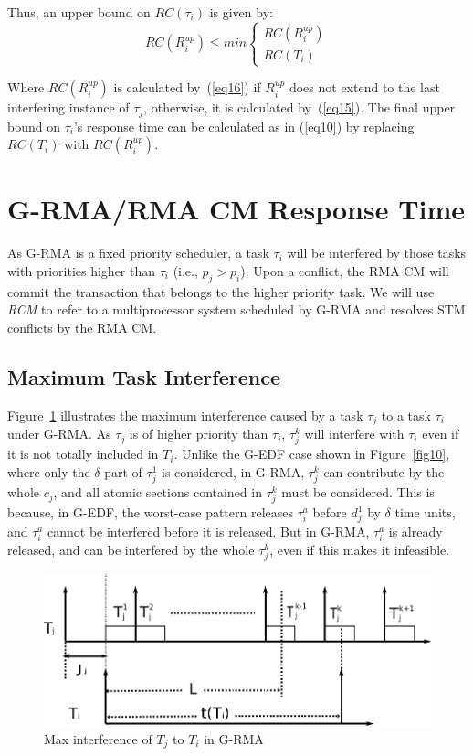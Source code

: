 \documentclass{sig-alternate}
\begin{document}
Thus, an upper bound on $RC(\tau_i)$ is given by:
\begin{equation}
RC(R_{i}^{up})\le min\begin{cases}
RC(R_{i}^{up})\\
RC(T_{i})\end{cases}
\label{eq17}
\end{equation}

Where $RC(R_i^{up})$ is calculated by~(\ref{eq16}) if $R_i^{up}$ does not extend to the last interfering instance of $\tau_j$, otherwise, it is calculated by~(\ref{eq15}). The final upper bound on $\tau_{i}$'s response time can be calculated
as in (\ref{eq10}) by replacing $RC(T_{i})$ with
$RC(R_{i}^{up})$.

\section{G-RMA/RMA CM Response Time}
\label{sec:g-rma-rma-cm}

As G-RMA is a fixed priority scheduler,  a task $\tau_{i}$ will be interfered by those tasks with priorities higher than $\tau_{i}$ (i.e., $p_{j}>p_{i}$).  Upon a conflict, the RMA CM will commit the transaction that belongs to the higher priority task. We will use \emph{RCM} to refer to a multiprocessor system scheduled by G-RMA and resolves STM conflicts by the RMA CM.


\subsection{Maximum Task Interference}


Figure~\ref{fig11} illustrates the maximum interference caused by a task $\tau_{j}$
to a task $\tau_{i}$ under G-RMA. As $\tau_{j}$ is of higher priority than $\tau_{i}$,
$\tau_{j}^{k}$ will interfere with $\tau_{i}$ even if it is not totally
included in $T_{i}$. Unlike the G-EDF case shown in Figure~\ref{fig10}, 
where only the $\delta$ part of $\tau_{j}^{1}$ is considered, in G-RMA,
$\tau_{j}^{k}$ can contribute by the whole $c_{j}$, and all atomic
sections contained in $\tau_{j}^{k}$ must be considered. This is because, in G-EDF, the worst-case pattern releases $\tau_{i}^a$ before $d_{j}^{1}$
by $\delta$ time units, and $\tau_{i}^a$ cannot be interfered before it
is released. But in G-RMA, $\tau_{i}^a$ is already released, and can be
interfered by the whole $\tau_{j}^{k}$, even if this makes it infeasible.


\begin{figure}[htbp]
\centering
\includegraphics[scale=0.5]{figures/figure11}\caption{\label{fig11}Max interference of $T_{j}$ to $T_{i}$ in G-RMA}
\end{figure}
\end{document}
